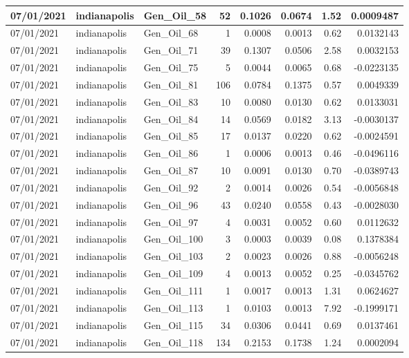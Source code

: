 \documentclass[
  letterpaper,
  DIV=11,
  numbers=noendperiod]{scrartcl}
\begin{document}
\begin{tabular}{l|l|l|r|r|r|r|r}
\hline
07/01/2021 & indianapolis & Gen\_Oil\_58 & 52 & 0.1026 & 0.0674 & 1.52 & 0.0009487\\
\hline
07/01/2021 & indianapolis & Gen\_Oil\_68 & 1 & 0.0008 & 0.0013 & 0.62 & 0.0132143\\
\hline
07/01/2021 & indianapolis & Gen\_Oil\_71 & 39 & 0.1307 & 0.0506 & 2.58 & 0.0032153\\
\hline
07/01/2021 & indianapolis & Gen\_Oil\_75 & 5 & 0.0044 & 0.0065 & 0.68 & -0.0223135\\
\hline
07/01/2021 & indianapolis & Gen\_Oil\_81 & 106 & 0.0784 & 0.1375 & 0.57 & 0.0049339\\
\hline
07/01/2021 & indianapolis & Gen\_Oil\_83 & 10 & 0.0080 & 0.0130 & 0.62 & 0.0133031\\
\hline
07/01/2021 & indianapolis & Gen\_Oil\_84 & 14 & 0.0569 & 0.0182 & 3.13 & -0.0030137\\
\hline
07/01/2021 & indianapolis & Gen\_Oil\_85 & 17 & 0.0137 & 0.0220 & 0.62 & -0.0024591\\
\hline
07/01/2021 & indianapolis & Gen\_Oil\_86 & 1 & 0.0006 & 0.0013 & 0.46 & -0.0496116\\
\hline
07/01/2021 & indianapolis & Gen\_Oil\_87 & 10 & 0.0091 & 0.0130 & 0.70 & -0.0389743\\
\hline
07/01/2021 & indianapolis & Gen\_Oil\_92 & 2 & 0.0014 & 0.0026 & 0.54 & -0.0056848\\
\hline
07/01/2021 & indianapolis & Gen\_Oil\_96 & 43 & 0.0240 & 0.0558 & 0.43 & -0.0028030\\
\hline
07/01/2021 & indianapolis & Gen\_Oil\_97 & 4 & 0.0031 & 0.0052 & 0.60 & 0.0112632\\
\hline
07/01/2021 & indianapolis & Gen\_Oil\_100 & 3 & 0.0003 & 0.0039 & 0.08 & 0.1378384\\
\hline
07/01/2021 & indianapolis & Gen\_Oil\_103 & 2 & 0.0023 & 0.0026 & 0.88 & -0.0056248\\
\hline
07/01/2021 & indianapolis & Gen\_Oil\_109 & 4 & 0.0013 & 0.0052 & 0.25 & -0.0345762\\
\hline
07/01/2021 & indianapolis & Gen\_Oil\_111 & 1 & 0.0017 & 0.0013 & 1.31 & 0.0624627\\
\hline
07/01/2021 & indianapolis & Gen\_Oil\_113 & 1 & 0.0103 & 0.0013 & 7.92 & -0.1999171\\
\hline
07/01/2021 & indianapolis & Gen\_Oil\_115 & 34 & 0.0306 & 0.0441 & 0.69 & 0.0137461\\
\hline
07/01/2021 & indianapolis & Gen\_Oil\_118 & 134 & 0.2153 & 0.1738 & 1.24 & 0.0002094\\

\end{tabular}
\end{document}
